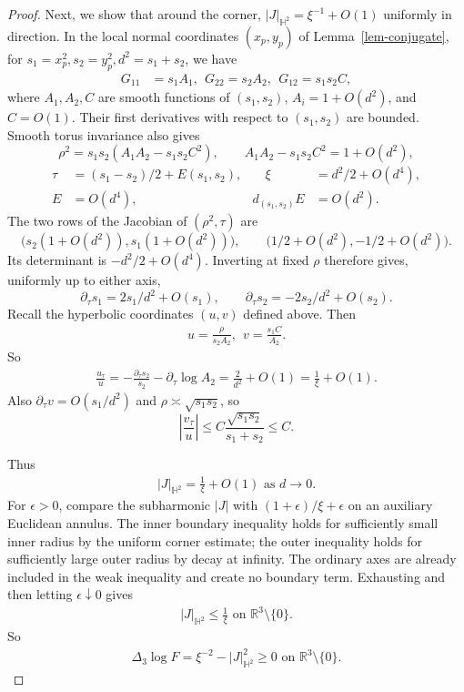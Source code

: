 \documentclass[letterpaper]{amsart}
\theoremstyle{definition}
\theoremstyle{remark}
\begin{document}
\begin{proof}
Next, we show that around the corner, $|J|_{\mathbb{H}^2} = \xi ^{-1} + O(1) $ uniformly in direction. In the local normal coordinates $(x_p,y_p)$ of Lemma~\ref{lem-conjugate}, for $s_1= x_p ^2, s_2= y_p^2, d ^2 = s_1+ s_2$, we have
\begin{align*}
	G_{11} &= s_1 A_1 ,\ \ G_{22}= s_2 A_2, \ \ G_{12} = s_1 s_2 C,
\end{align*} 
where $A_1,A_2,C$ are smooth functions of $(s_1,s_2)$, $A_i=1+O(d^2)$, and $C=O(1)$. Their first derivatives with respect to $(s_1,s_2)$ are bounded. Smooth torus invariance also gives
\[
 \rho^2=s_1s_2(A_1A_2-s_1s_2C^2),\qquad
 A_1A_2-s_1s_2C^2=1+O(d^2),
\]
\[
 \begin{aligned}
 \tau&=(s_1-s_2)/2+E(s_1,s_2),&\quad \xi&=d^2/2+O(d^4),\\
 E&=O(d^4),& d_{(s_1,s_2)}E&=O(d^2).
 \end{aligned}
\]
The two rows of the Jacobian of $(\rho^2,\tau)$ are
\[
 \bigl(s_2(1+O(d^2)),s_1(1+O(d^2))\bigr),\qquad
 \bigl(1/2+O(d^2),-1/2+O(d^2)\bigr).
\]
Its determinant is $-d^2/2+O(d^4)$. Inverting at fixed $\rho$ therefore gives, uniformly up to either axis,
\[
 \partial_\tau s_1=2s_1/d^2+O(s_1),\qquad
 \partial_\tau s_2=-2s_2/d^2+O(s_2).
\]
Recall the hyperbolic coordinates $(u,v)$ defined above. Then
\begin{align*}
	u = \frac{\rho }{s_2 A_2} ,\ \ v = \frac{s_1 C}{A_2}.
\end{align*} 
So
\begin{align*}
	\frac{u_{\tau }}{u} = - \frac{\partial _{\tau } s_2}{s_2} - \partial _{\tau } \log A_2= \frac{2}{d ^2} + O(1) = \frac{1}{\xi }+ O(1).
\end{align*} 
Also $\partial_\tau v=O(s_1/d^2)$ and $\rho\asymp\sqrt{s_1s_2}$, so
\[
 \left|\frac{v_\tau}{u}\right|
 \le C\frac{\sqrt{s_1s_2}}{s_1+s_2}\le C.
\]

Thus
\begin{align*}
	|J|_{\mathbb{H}^2} = \frac{1}{\xi } + O(1) \text{ as } d \to 0.
\end{align*} 
For $\epsilon>0$, compare the subharmonic $|J|$ with $(1+\epsilon)/\xi+\epsilon$ on an auxiliary Euclidean annulus. The inner boundary inequality holds for sufficiently small inner radius by the uniform corner estimate; the outer inequality holds for sufficiently large outer radius by decay at infinity. The ordinary axes are already included in the weak inequality and create no boundary term. Exhausting and then letting $\epsilon\downarrow0$ gives
\begin{align*}
	|J|_{\mathbb{H}^2} \leq \frac{1}{\xi } \text{ on } \mathbb{R}^3 \setminus \{0\} .
\end{align*} 
So
\begin{align*}
	\Delta _{3} \log F = \xi ^{-2} - |J|^2_{\mathbb{H}^2} \geq 0 \text{ on } \mathbb{R}^3 \setminus \{0\} .
\end{align*} 

\end{proof}
\end{document}

